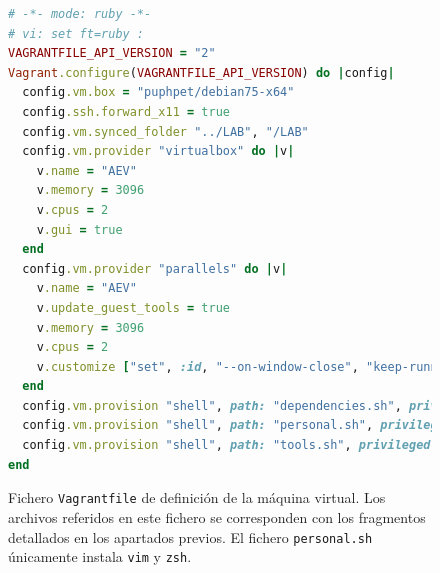 \begin{figure}

\begin{lstlisting}[basicstyle=\ttfamily\scriptsize,language=Ruby,frame=single]
# -*- mode: ruby -*-
# vi: set ft=ruby :
VAGRANTFILE_API_VERSION = "2"
Vagrant.configure(VAGRANTFILE_API_VERSION) do |config|
  config.vm.box = "puphpet/debian75-x64"
  config.ssh.forward_x11 = true
  config.vm.synced_folder "../LAB", "/LAB"
  config.vm.provider "virtualbox" do |v|
    v.name = "AEV"
    v.memory = 3096
    v.cpus = 2
    v.gui = true
  end
  config.vm.provider "parallels" do |v|
    v.name = "AEV"
    v.update_guest_tools = true
    v.memory = 3096
    v.cpus = 2
    v.customize ["set", :id, "--on-window-close", "keep-running"]
  end
  config.vm.provision "shell", path: "dependencies.sh", privileged: false
  config.vm.provision "shell", path: "personal.sh", privileged: false
  config.vm.provision "shell", path: "tools.sh", privileged: false
end
\end{lstlisting}

	\caption{Fichero {\tt Vagrantfile} de definición de la máquina virtual. Los archivos referidos en este fichero se corresponden con los fragmentos detallados en los apartados previos. El fichero {\tt personal.sh} únicamente instala {\tt vim} y {\tt zsh}.}
	\label{fig:Vagrantfile}
\end{figure}